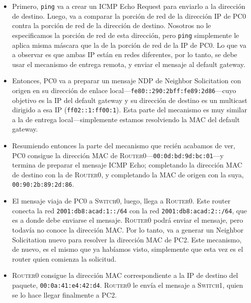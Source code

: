 \documentclass[a4paper,10pt]{corsage}
\newcommand{\ipaddress}[1]{\texttt{#1}}
\newcommand{\macaddress}[1]{\ipaddress{#1}}
\newcommand{\devname}[1]{\textsc{#1}}
\begin{document}
		\begin{itemize}
			\item Primero, \texttt{ping} va a crear un ICMP Echo Request para enviarlo a la dirección de destino.  Luego, va a comparar la porción de red de la dirección IP de \devname{PC0} contra la porción de red de la dirección de destino.  Nosotros no le especificamos la porción de red de esta dirección, pero \texttt{ping} simplemente le aplica misma máscara que la de la porción de red de la IP de \devname{PC0}.  Lo que va a observar es que ambas IP están en redes diferentes, por lo tanto, se debe usar el mecanismo de entrega remota, y enviar el mensaje al default gateway.

			\item Entonces, \devname{PC0} va a preparar un mensaje NDP de Neighbor Solicitation con origen en su dirección de enlace local---\ipaddress{fe80::290:2bff:fe89:2d86}---cuyo objetivo es la IP del default gateway y su dirección de destino es un multicast dirigido a esa IP (\ipaddress{ff02::1:ff00:1}).  Esta parte del mecanismo es muy similar a la de entrega local---simplemente estamos resolviendo la MAC del default gateway.

			\item Resumiendo entonces la parte del mecanismo que recién acabamos de ver, \devname{PC0} consigue la dirección MAC de \devname{Router0}---\macaddress{00:0d:bd:9d:bc:01}---y termina de preparar el mensaje ICMP Echo; completando la dirección MAC de destino con la de \devname{Router0}, y completando la MAC de origen con la suya, \macaddress{00:90:2b:89:2d:86}.

			\item El mensaje viaja de \devname{PC0} a \devname{Switch0}, luego, llega a \devname{Router0}.  Este router conecta la red \ipaddress{2001:db8:acad:1::/64} con la red \ipaddress{2001:db8:acad:2::/64}, que es a donde debe enviarse el mensaje.  \devname{Router0} podrá enviar el mensaje, pero todavía no conoce la dirección MAC.  Por lo tanto, va a generar un Neighbor Solicitation nuevo para resolver la dirección MAC de \devname{PC2}.  Este mecanismo, de nuevo, es el mismo que ya habíamos visto, simplemente que esta vez es el router quien comienza la solicitud.

			\item \devname{Router0} consigue la dirección MAC correspondiente a la IP de destino del paquete, \macaddress{00:0a:41:e4:42:d4}.  \devname{Router0} le envía el mensaje a \devname{Switch1}, quien se lo hace llegar finalmente a \devname{PC2}.


\end{itemize}
\end{document}

